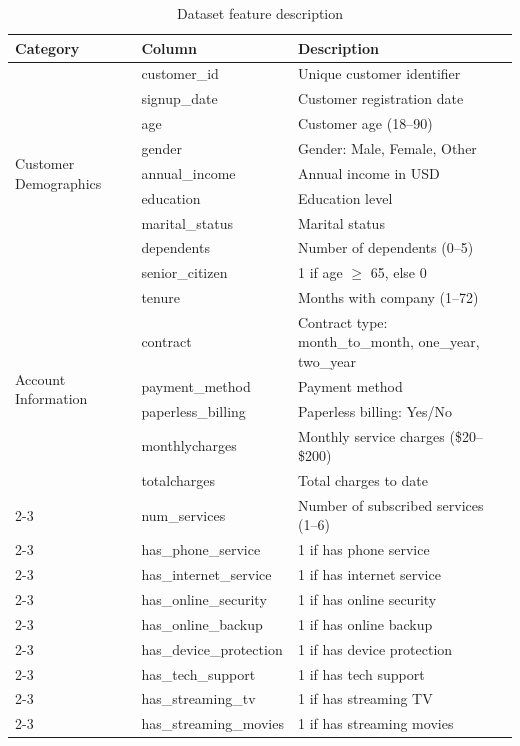 \begin{table}[ht]
\centering
\caption{Dataset feature description}
\label{tab:dataset_features}
\begin{tabularx}{\textwidth}{|l|l|X|}
\hline
\textbf{Category} & \textbf{Column} & \textbf{Description} \\
\hline

\multirow{9}{*}{Customer Demographics}
& customer\_id & Unique customer identifier \\ \cline{2-3}
& signup\_date & Customer registration date \\ \cline{2-3}
& age & Customer age (18--90) \\ \cline{2-3}
& gender & Gender: Male, Female, Other \\ \cline{2-3}
& annual\_income & Annual income in USD \\ \cline{2-3}
& education & Education level \\ \cline{2-3}
& marital\_status & Marital status \\ \cline{2-3}
& dependents & Number of dependents (0--5) \\ \cline{2-3}
& senior\_citizen & 1 if age $\geq$ 65, else 0 \\
\hline

\multirow{6}{*}{Account Information}
& tenure & Months with company (1--72) \\ \cline{2-3}
& contract & Contract type: month\_to\_month, one\_year, two\_year \\ \cline{2-3}
& payment\_method & Payment method \\ \cline{2-3}
& paperless\_billing & Paperless billing: Yes/No \\
\hline

\multirow{13}{*}{Service Usage \& Billing}
& monthlycharges & Monthly service charges (\$20--\$200) \\ \cline{2-3}
& totalcharges & Total charges to date \\ \cline{2-3}
& num\_services & Number of subscribed services (1--6) \\ \cline{2-3}
& has\_phone\_service & 1 if has phone service \\ \cline{2-3}
& has\_internet\_service & 1 if has internet service \\ \cline{2-3}
& has\_online\_security & 1 if has online security \\ \cline{2-3}
& has\_online\_backup & 1 if has online backup \\ \cline{2-3}
& has\_device\_protection & 1 if has device protection \\ \cline{2-3}
& has\_tech\_support & 1 if has tech support \\ \cline{2-3}
& has\_streaming\_tv & 1 if has streaming TV \\ \cline{2-3}
& has\_streaming\_movies & 1 if has streaming movies \\
\hline


\end{tabularx}
\end{table}
